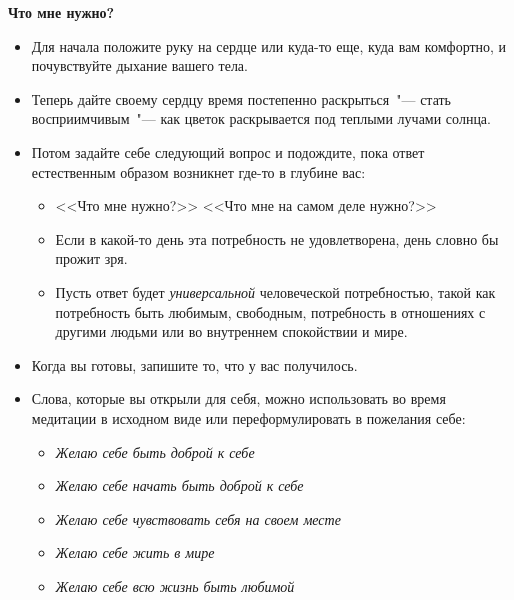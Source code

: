 \vspace{2ex}

{\large \textbf{Что мне нужно?}}
\begin{itemize}
	\item Для начала положите руку на сердце или куда-то еще, куда вам комфортно, и почувствуйте дыхание вашего тела.
	
	\item Теперь дайте своему сердцу время постепенно раскрыться~"--- стать восприимчивым~"--- как цветок раскрывается под теплыми лучами солнца.
	
	\item Потом задайте себе следующий вопрос и подождите, пока ответ естественным образом возникнет где-то в глубине вас:
	
	\begin{itemize}
		\item <<Что мне нужно?>> <<Что мне на самом деле нужно?>>
		
		\item Если в какой-то день эта потребность не удовлетворена, день словно бы прожит зря.
		
		\item Пусть ответ будет \emph{универсальной} человеческой потребностью, такой как потребность быть любимым, свободным, потребность в отношениях с другими людьми или во внутреннем спокойствии и мире.
	\end{itemize}

	\item Когда вы готовы, запишите то, что у вас получилось.
	
	\item Слова, которые вы открыли для себя, можно использовать во время медитации в исходном виде или переформулировать в пожелания себе:
	
	\begin{itemize}
		\item \emph{Желаю себе быть доброй к себе}
		\item \emph{Желаю себе начать быть доброй к себе}
		\item \emph{Желаю себе чувствовать себя на своем месте}
		\item \emph{Желаю себе жить в мире}
		\item \emph{Желаю себе всю жизнь быть любимой} 
	\end{itemize}
\end{itemize}


